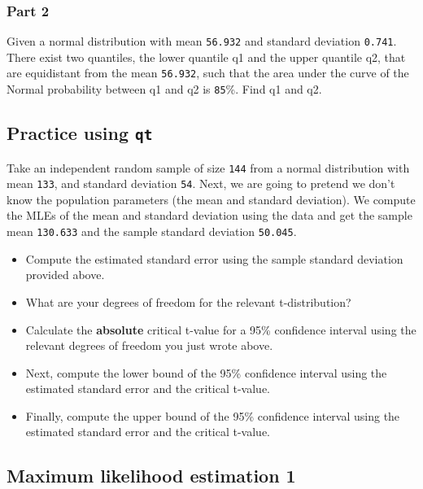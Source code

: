 \documentclass[12pt,]{krantz}
\providecommand{\tightlist}{%
  \setlength{\itemsep}{0pt}\setlength{\parskip}{0pt}}
\begin{document}
\hypertarget{part-2-1}{%
\subsubsection{Part 2}\label{part-2-1}}

Given a normal distribution with mean \texttt{56.932} and standard deviation \texttt{0.741}. There exist two quantiles, the lower quantile q1 and the upper quantile q2, that are equidistant from the mean \texttt{56.932}, such that the area under the curve of the Normal probability between q1 and q2 is \texttt{85}\%. Find q1 and q2.

\hypertarget{practice-using-qt}{%
\subsection{\texorpdfstring{Practice using \texttt{qt}}{Practice using qt}}\label{practice-using-qt}}

Take an independent random sample of size \texttt{144} from a normal distribution
with mean \texttt{133}, and standard deviation \texttt{54}. Next, we are going to pretend we don't know the population parameters (the mean and standard deviation). We compute the MLEs of the mean and standard deviation using the data and get the sample mean \texttt{130.633} and the sample standard deviation \texttt{50.045}.

\begin{itemize}
\tightlist
\item
  Compute the estimated standard error using the sample standard deviation provided above.
\item
  What are your degrees of freedom for the relevant t-distribution?
\item
  Calculate the \textbf{absolute} critical t-value for a 95\% confidence interval using the relevant degrees of freedom you just wrote above.
\item
  Next, compute the lower bound of the 95\% confidence interval using the estimated standard error and the critical t-value.
\item
  Finally, compute the upper bound of the 95\% confidence interval using the estimated standard error and the critical t-value.
\end{itemize}

\hypertarget{maximum-likelihood-estimation-1}{%
\subsection{Maximum likelihood estimation 1}\label{maximum-likelihood-estimation-1}}
\end{document}
